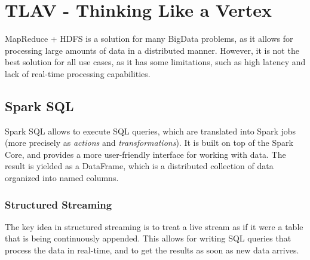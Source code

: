 \chapter{TLAV - Thinking Like a Vertex}

MapReduce + HDFS is a solution for many BigData problems, as it allows for processing large amounts of data in a distributed manner. However, it is not the best solution for all use cases, as it has some limitations, such as high latency and lack of real-time processing capabilities.


\section{Spark SQL}
Spark SQL allows to execute SQL queries, which are translated into Spark jobs (more precisely as \textit{actions} and \textit{transformations}). It is built on top of the Spark Core, and provides a more user-friendly interface for working with data.
The result is yielded as a DataFrame, which is a distributed collection of data organized into named columns.

\subsection{Structured Streaming}
The key idea in structured streaming is to treat a live stream as if it were a table that is being continuously appended. This allows for writing SQL queries that process the data in real-time, and to get the results as soon as new data arrives.

